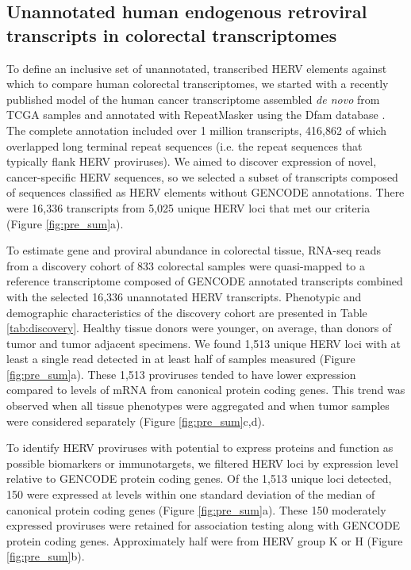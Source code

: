 \subsection*{Unannotated human endogenous retroviral transcripts in colorectal transcriptomes}
To define an inclusive set of unannotated, transcribed HERV elements against which to compare human colorectal transcriptomes, we started with a recently published model of the human cancer transcriptome assembled \emph{de novo} from TCGA samples and annotated with RepeatMasker using the Dfam database \citep{Attig2019}.
The complete annotation included over 1 million transcripts, 416,862 of which overlapped long terminal repeat sequences (i.e. the repeat sequences that typically flank HERV proviruses).
We aimed to discover expression of novel, cancer-specific HERV sequences, so we selected a subset of transcripts composed of sequences classified as HERV elements without GENCODE annotations.
There were 16,336 transcripts from 5,025 unique HERV loci that met our criteria (Figure \ref{fig:pre_sum}a).

To estimate gene and proviral abundance in colorectal tissue, RNA-seq reads from a discovery cohort of 833 colorectal samples were quasi-mapped to a reference transcriptome composed of GENCODE annotated transcripts combined with the selected 16,336 unannotated HERV transcripts.
Phenotypic and demographic characteristics of the discovery cohort are presented in Table \ref{tab:discovery}.
Healthy tissue donors were younger, on average, than donors of tumor and tumor adjacent specimens.
We found 1,513 unique HERV loci with at least a single read detected in at least half of samples measured (Figure \ref{fig:pre_sum}a).
These 1,513 proviruses tended to have lower expression compared to levels of mRNA from canonical protein coding genes.
This trend was observed when all tissue phenotypes were aggregated and when tumor samples were considered separately (Figure \ref{fig:pre_sum}c,d).

To identify HERV proviruses with potential to express proteins and function as possible biomarkers or immunotargets, we filtered HERV loci by expression level relative to GENCODE protein coding genes.
Of the 1,513 unique loci detected, 150 were expressed at levels within one standard deviation of the median of canonical protein coding genes (Figure \ref{fig:pre_sum}a).
These 150 moderately expressed proviruses were retained for association testing along with GENCODE protein coding genes.
Approximately half were from HERV group K or H (Figure \ref{fig:pre_sum}b).

